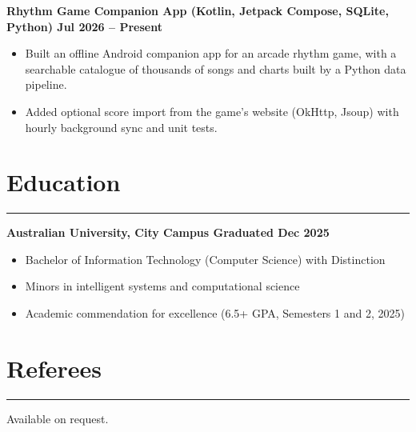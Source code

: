 \documentclass[10pt,a4paper]{article}
\newcommand{\ressection}[1]{%
  \section*{#1}%
  \vspace{-12pt}%
  \noindent\rule{\textwidth}{0.4pt}%
  \vspace{0pt}%
}
\begin{document}
\textbf{Rhythm Game Companion App (Kotlin, Jetpack Compose, SQLite, Python) \hfill Jul 2026 -- Present}
\begin{itemize}
      \item Built an offline Android companion app for an arcade rhythm game, with a searchable catalogue of thousands of songs and charts built by a Python data pipeline.
      \item Added optional score import from the game's website (OkHttp, Jsoup) with hourly background sync and unit tests.
\end{itemize}

\ressection{Education}

\textbf{Australian University, City Campus \hfill Graduated Dec 2025}
\begin{itemize}
      \item Bachelor of Information Technology (Computer Science) with Distinction
      \item Minors in intelligent systems and computational science
      \item Academic commendation for excellence (6.5+ GPA, Semesters 1 and 2, 2025)
\end{itemize}

\ressection{Referees}

Available on request.
\end{document}

